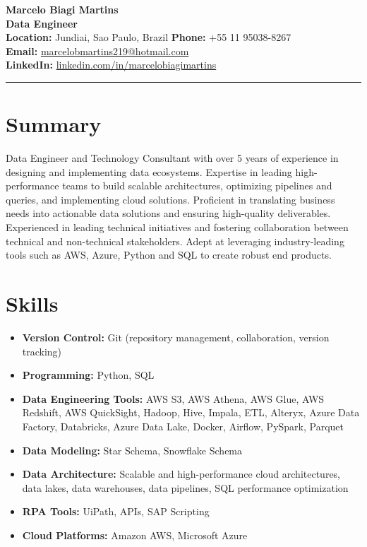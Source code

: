 \documentclass[a4paper,10pt]{article}
\begin{document}
\begin{center}
    {\LARGE \textbf{Marcelo Biagi Martins}} \\
    {\large \textbf{Data Engineer}} \\
    \textbf{Location:} Jundiai, Sao Paulo, Brazil \textbar \hspace{0.1em} \textbf{Phone:} +55 11 95038-8267 \\
    \textbf{Email:} \href{mailto:marcelobmartins219@hotmail.com}{marcelobmartins219@hotmail.com} \\
    \textbf{LinkedIn:} \href{https://www.linkedin.com/in/marcelobiagimartins/}{linkedin.com/in/marcelobiagimartins} \\
\end{center}

\hrule
\vspace{1em}

\section*{Summary}
Data Engineer and Technology Consultant with over 5 years of experience in designing and implementing data ecosystems. %
Expertise in leading high-performance teams to build scalable architectures, optimizing pipelines and queries, and implementing cloud solutions. %
Proficient in translating business needs into actionable data solutions and ensuring high-quality deliverables. Experienced in leading technical initiatives %
and fostering collaboration between technical and non-technical stakeholders. Adept at leveraging industry-leading tools such as AWS, Azure, Python and SQL to create robust end products.

\section*{Skills}
\begin{itemize}[leftmargin=*]
    \item \textbf{Version Control:} Git (repository management, collaboration, version tracking)
    \item \textbf{Programming:} Python, SQL
    \item \textbf{Data Engineering Tools:} AWS S3, AWS Athena, AWS Glue, AWS Redshift, AWS QuickSight, Hadoop, Hive, Impala, ETL, Alteryx, Azure Data Factory, Databricks, Azure Data Lake, Docker, Airflow, PySpark, Parquet
    \item \textbf{Data Modeling:} Star Schema, Snowflake Schema
    \item \textbf{Data Architecture:} Scalable and high-performance cloud architectures, data lakes, data warehouses, data pipelines, SQL performance optimization
    \item \textbf{RPA Tools:} UiPath, APIs, SAP Scripting
    \item \textbf{Cloud Platforms:} Amazon AWS, Microsoft Azure
\end{itemize}
\end{document}
